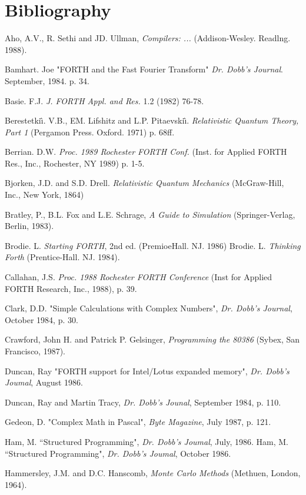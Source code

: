 \chapter*{Bibliography}

Aho, A.V., R. Sethi and JD. Ullman, \textit{Compilers: ...} (Addison-Wesley. Readlng. 1988).

Bamhart. Joe "FORTH and the Fast Fourier Transform" \textit{Dr. Dobb's Journal}. September, 1984. p. 34.

Basie. F.J. \textit{J. FORTH Appl. and Res.} 1.2 (1982) 76-78.

Berestetki\protect\^{\i}. V.B., EM. Lifshitz and L.P. Pitaevski\protect\^{\i}. \textit{Relativistic Quantum Theory, Part 1} (Pergamon Press. Oxford. 1971) p. 68ff.

Berrian. D.W. \textit{Proc. 1989 Rochester FORTH Conf.} (Inst. for Applied FORTH Res., Inc., Rochester, NY 1989) p. 1-5.

Bjorken, J.D. and S.D. Drell. \textit{Relativistic Quantum Mechanics} (McGraw-Hill, Inc., New York, 1864)

Bratley, P., B.L. Fox and L.E. Schrage, \textit{A Guide to Simulation} (Springer-Verlag, Berlin, 1983).

Brodie. L. \textit{Starting FORTH}, 2nd ed. (PremioeHall. NJ. 1986)
Brodie. L. \textit{Thinking Forth} (Prentice-Hall. NJ. 1984).

Callahan, J.S. \textit{Proc. 1988 Rochester FORTH Conference} (Inst for Applied FORTH Research, Inc., 1988), p. 39.

Clark, D.D. "Simple Calculations with Complex Numbers", \textit{Dr. Dobb's Journal}, October 1984, p. 30.

Crawford, John H. and Patrick P. Gelsinger, \textit{Programming the 80386} (Sybex, San Francisco, 1987).

Duncan, Ray "FORTH support for Intel/Lotus expanded memory", \textit{Dr. Dobb's Joumal}, August 1986.

Duncan, Ray and Martin Tracy, \textit{Dr. Dobb's Jounal}, September 1984, p. 110.

Gedeon, D. "Complex Math in Pascal", \textit{Byte Magazine}, July 1987, p. 121.

Ham, M. “Structured Programming", \textit{Dr. Dobb's Joumal}, July, 1986.
Ham, M. “Structured Programming", \textit{Dr. Dobb's Joumal}, October 1986.

Hammersley, J.M. and D.C. Hanscomb, \textit{Monte Carlo Methods} (Methuen, London, 1964).

